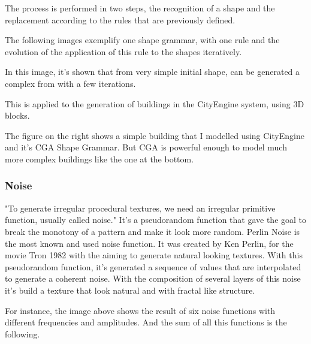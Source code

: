 The process is performed in two steps, the recognition of a shape and the replacement according to the rules that are previously defined. 

The following images exemplify one shape grammar, with one rule and the evolution of the application of this rule to the shapes iteratively.



In this image, it's shown that from very simple initial shape, can be generated a complex from with a few iterations.




This is applied to the generation of buildings in the CityEngine system, using 3D blocks.





The figure on the right shows a simple building that I modelled using CityEngine and it's CGA Shape Grammar. But CGA is powerful enough to model much more complex buildings like the one at the bottom.

 

















\subsubsection{Noise} %
\label{ssub:noise}


"To generate irregular procedural textures, we need an irregular primitive function,
usually called noise." It's a pseudorandom function that gave the goal to break the monotony of a pattern and make it look more random.
Perlin Noise is the most known and used noise function. It was created by Ken Perlin, for the movie Tron 1982 with the aiming to generate natural looking textures.
With this pseudorandom function, it's generated a sequence of values that are interpolated to generate a coherent noise. With the composition of several layers of this noise it's build a texture that look natural and with fractal like structure.




 For instance, the image above shows the result of six noise functions with different frequencies and amplitudes. And the sum of all this functions is the following.

